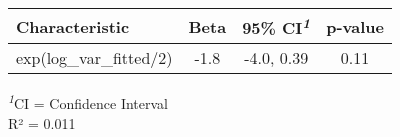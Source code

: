 
\fontsize{12.0pt}{14.4pt}\selectfont
\begin{tabular*}{\linewidth}{@{\extracolsep{\fill}}lccc}
\toprule
\textbf{Characteristic} & \textbf{Beta} & \textbf{95\% CI}\textsuperscript{\textit{1}} & \textbf{p-value} \\ 
\midrule\addlinespace[2.5pt]
exp(log\_var\_fitted/2) & -1.8 & -4.0, 0.39 & 0.11 \\ 
\bottomrule
\end{tabular*}
\begin{minipage}{\linewidth}
\textsuperscript{\textit{1}}CI = Confidence Interval\\
R² = 0.011\\
\end{minipage}


